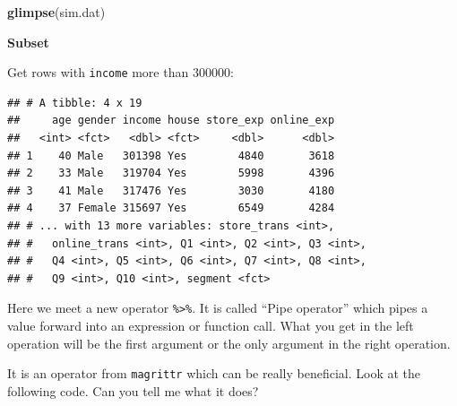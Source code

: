 \documentclass[12pt,]{krantz}
\newenvironment{Shaded}{\begin{snugshade}}{\end{snugshade}}
\newcommand{\KeywordTok}[1]{\textcolor[rgb]{0.13,0.29,0.53}{\textbf{#1}}}
\newcommand{\DecValTok}[1]{\textcolor[rgb]{0.00,0.00,0.81}{#1}}
\newcommand{\StringTok}[1]{\textcolor[rgb]{0.31,0.60,0.02}{#1}}
\newcommand{\OperatorTok}[1]{\textcolor[rgb]{0.81,0.36,0.00}{\textbf{#1}}}
\newcommand{\NormalTok}[1]{#1}
\theoremstyle{definition}
\theoremstyle{definition}
\theoremstyle{definition}
\theoremstyle{remark}
\begin{document}
\begin{Shaded}
\begin{Highlighting}[]
\KeywordTok{glimpse}\NormalTok{(sim.dat)}
\end{Highlighting}
\end{Shaded}

\textbf{Subset}

Get rows with \texttt{income} more than 300000:

\begin{Shaded}
\end{Shaded}

\begin{verbatim}
## # A tibble: 4 x 19
##     age gender income house store_exp online_exp
##   <int> <fct>   <dbl> <fct>     <dbl>      <dbl>
## 1    40 Male   301398 Yes        4840       3618
## 2    33 Male   319704 Yes        5998       4396
## 3    41 Male   317476 Yes        3030       4180
## 4    37 Female 315697 Yes        6549       4284
## # ... with 13 more variables: store_trans <int>,
## #   online_trans <int>, Q1 <int>, Q2 <int>, Q3 <int>,
## #   Q4 <int>, Q5 <int>, Q6 <int>, Q7 <int>, Q8 <int>,
## #   Q9 <int>, Q10 <int>, segment <fct>
\end{verbatim}

Here we meet a new operator \texttt{\%\textgreater{}\%}. It is called
``Pipe operator'' which pipes a value forward into an expression or
function call. What you get in the left operation will be the first
argument or the only argument in the right operation.

\begin{Shaded}
\end{Shaded}

It is an operator from \texttt{magrittr} which can be really beneficial.
Look at the following code. Can you tell me what it does?
\end{document}
